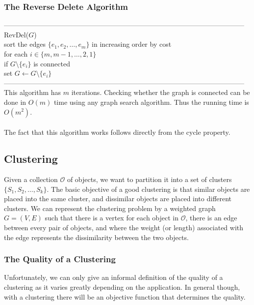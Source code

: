 \documentclass{article}
\newcommand{\mcal}[1]{\mathcal{#1}}
\begin{document}
\subsubsection{The Reverse Delete Algorithm}
---------------------------------------------------------------------------------------------------------
RevDel($G$)\\
	\hspace*{7mm} sort the edges $\{e_1, e_2, \dots, e_m\}$ in increasing order by cost\\
	\hspace*{7mm} for each $i \in \{m, m-1, \dots, 2, 1\}$\\
	\hspace*{14mm} if $G \setminus \{e_i\}$ is connected\\
	\hspace*{21mm} set $G \leftarrow G \setminus \{e_i\}$\\
---------------------------------------------------------------------------------------------------------\\
This algorithm has $m$ iterations. Checking whether the graph is connected can be done in $O(m)$ time using any graph search algorithm. Thus the running time is $O(m^2)$.\\\\
The fact that this algorithm works follows directly from the cycle property.
\subsection{Clustering}
Given a collection $\mcal{O}$ of objects, we want to partition it into a set of clusters $\{S_1, S_2, \dots, S_k\}$. The basic objective of a good clustering is that similar objects are placed into the same cluster, and dissimilar objects are placed into different clusters. We can represent the clustering problem by a weighted graph $G = (V, E)$ such that there is a vertex for each object in $\mcal{O}$, there is an edge between every pair of objects, and where the weight (or length) associated with the edge represents the dissimilarity between the two objects.
\subsubsection{The Quality of a Clustering}
Unfortunately, we can only give an informal definition of the quality of a clustering as it varies greatly depending on the application. In general though, with a clustering there will be an objective function that determines the quality.
\end{document}
